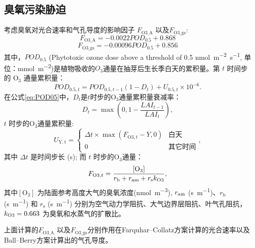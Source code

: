 \subsection{臭氧污染胁迫}
考虑臭氧对光合速率和气孔导度的影响因子 $F_{\mathrm{O3\_A}}$ 以及$F_{\mathrm{O3\_{gs}}}$:
\begin{equation}
F_{\mathrm{O3\_{A}}}=-0.0022 POD_{\mathrm{0.5}}+0.868
\end{equation}
\begin{equation}
F_{\mathrm{O3\_{gs}}}=-0.00096 POD_{\mathrm{0.5}}+0.856
\end{equation}
其中，$POD_{0.5}$ (Phytotoxic ozone dose above a threshold of 0.5 \unit{nmol.m^{-2}.s^{-1}}, 单位：\unit{mmol.m^{-2}})是植物吸收的$O_3$通量在抽芽后生长季白天的累积量。第 $t$ 时间步的 $\mathrm{O_3}$ 通量累积量：
\begin{equation}\label{eq:POD05}
POD_{0.5,t}=POD_{0.5,t-1}\left(1-D_t\right)+U_{0.5,t} \times 10^{-6}.
\end{equation}
在公式\eqref{eq:POD05}中，$D_t$是$t$时步的$\mathrm{O_3}$通量累积量衰减率：
\begin{equation}
D_t = \max\left(0, 1-\frac{LAI_{t-1}}{LAI_t} \right),
\end{equation}
$t$ 时步的$\mathrm{O_3}$通量累积量:
\begin{equation}
U_{\mathrm{Y,t}}=\begin{cases}
  \Delta t\times\max(F_{{\mathrm {O3}},t}-Y, 0) & \text{白天} \\
    0 & \text{其它时间}
\end{cases},
\end{equation}
其中 $\Delta t$ 是时间步长 (s); 而 $t$ 时步的$\mathrm{O_3}$通量：
\begin{equation}
  F_{{\mathrm {O3}},t}=\frac{\mathrm{[O_3]}}{r_{\mathrm {b}}  + r_{\mathrm{am}} + r_{\mathrm s}k_{\rm O3}},
\end{equation}
其中$\mathrm{[O_3]}$ 为陆面参考高度大气的臭氧浓度(\unit{nmol.m^{-3}}), $r_{\rm am}$ (\unit{s.m^{-1}})、$r_{\mathrm {b}} $ (\unit{s.m^{-1}}) 和 $r_{\mathrm {s}} $ (\unit{s.m^{-1}}) 分别为空气动力学阻抗、大气边界层阻抗、叶气孔阻抗，$k_{\rm O3}=0.663$ 为臭氧和水蒸气的扩散比。

上面计算的$F_{\mathrm{{O3}\_A}}$ 以及$F_{\mathrm{O3\_{gs}}}$分别作用在Farquhar--Collatz方案计算的光合速率以及Ball--Berry方案计算出的气孔导度。

